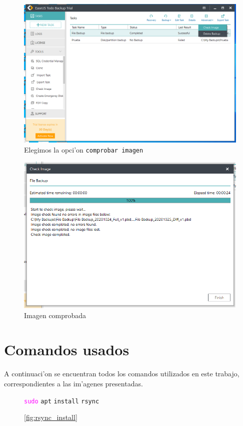 \documentclass[11pt]{article}
\newcommand{\imagecaption}[1]{\vspace{-7pt}\caption*{\char91\ref{fig:#1}\char93}}
\newcommand{\codetext}[2]{\large\texttt{\textcolor{#1}{#2}}}
\begin{document}
    \begin{figure}[H]
		\centering
		\includegraphics[scale=0.6, width=.8\textwidth]{Images/easeus/pendrive/20-t2_ch1.png}
		\caption{Elegimos la opci'on \texttt{comprobar imagen}}
	\end{figure}
    
    \begin{figure}[H]
		\centering
		\includegraphics[scale=0.6, width=.8\textwidth]{Images/easeus/pendrive/21-t2_ch2.png}
		\caption{Imagen comprobada}
        \label{resultados}
    \end{figure}

	\newpage
	\section{Comandos usados}
		A continuaci'on se encuentran todos los comandos utilizados en este trabajo, correspondientes a las im'agenes presentadas.

		\begin{figure}[H]
			\centering
			\begin{code-box}
				\codetext{fuchsia}{sudo} \codetext{light-blue}{apt} \codetext{light-orange}{install} \codetext{light-red}{rsync}
			\end{code-box}
			\imagecaption{rsync_install}
		\end{figure}
\end{document}
